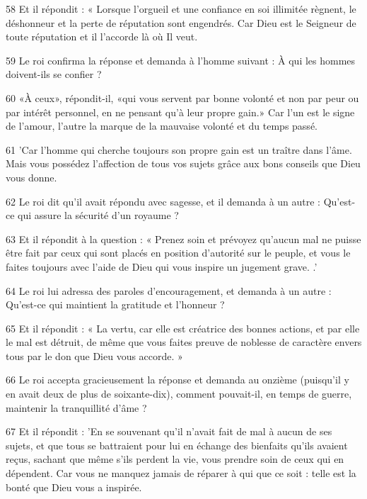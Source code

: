 \par 58 Et il répondit : « Lorsque l'orgueil et une confiance en soi illimitée règnent, le déshonneur et la perte de réputation sont engendrés. Car Dieu est le Seigneur de toute réputation et il l'accorde là où Il veut.

\par 59 Le roi confirma la réponse et demanda à l'homme suivant : À qui les hommes doivent-ils se confier ?

\par 60 «À ceux», répondit-il, «qui vous servent par bonne volonté et non par peur ou par intérêt personnel, en ne pensant qu'à leur propre gain.» Car l’un est le signe de l’amour, l’autre la marque de la mauvaise volonté et du temps passé.

\par 61 'Car l'homme qui cherche toujours son propre gain est un traître dans l'âme. Mais vous possédez l'affection de tous vos sujets grâce aux bons conseils que Dieu vous donne.

\par 62 Le roi dit qu'il avait répondu avec sagesse, et il demanda à un autre : Qu'est-ce qui assure la sécurité d'un royaume ?

\par 63 Et il répondit à la question : « Prenez soin et prévoyez qu'aucun mal ne puisse être fait par ceux qui sont placés en position d'autorité sur le peuple, et vous le faites toujours avec l'aide de Dieu qui vous inspire un jugement grave. .'

\par 64 Le roi lui adressa des paroles d'encouragement, et demanda à un autre : Qu'est-ce qui maintient la gratitude et l'honneur ?

\par 65 Et il répondit : « La vertu, car elle est créatrice des bonnes actions, et par elle le mal est détruit, de même que vous faites preuve de noblesse de caractère envers tous par le don que Dieu vous accorde. »

\par 66 Le roi accepta gracieusement la réponse et demanda au onzième (puisqu'il y en avait deux de plus de soixante-dix), comment pouvait-il, en temps de guerre, maintenir la tranquillité d'âme ?

\par 67 Et il répondit : 'En se souvenant qu'il n'avait fait de mal à aucun de ses sujets, et que tous se battraient pour lui en échange des bienfaits qu'ils avaient reçus, sachant que même s'ils perdent la vie, vous prendre soin de ceux qui en dépendent. Car vous ne manquez jamais de réparer à qui que ce soit : telle est la bonté que Dieu vous a inspirée.

